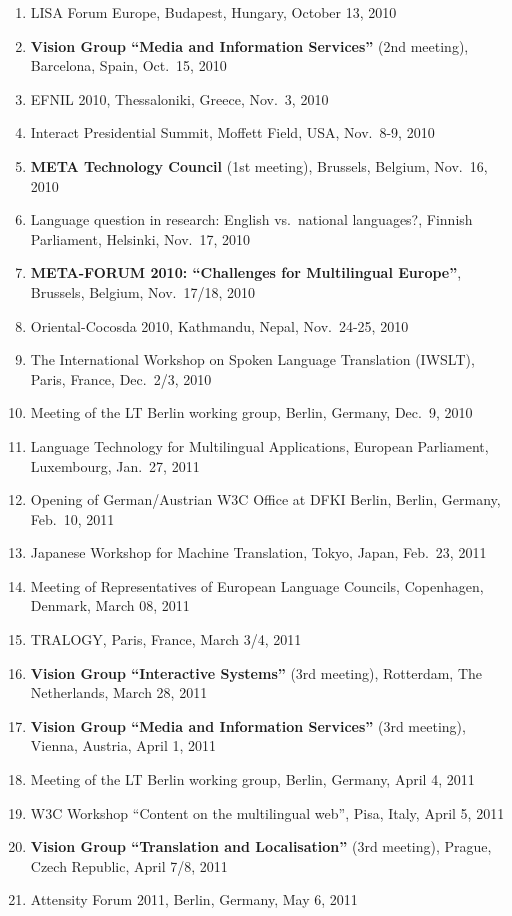 \documentclass[10pt, plain]{../../metanetpaper}
\begin{document}
\begin{small}
\begin{enumerate}
\item LISA Forum Europe, Budapest, Hungary, October 13, 2010
\item \textbf{Vision Group ``Media and Information Services''} (2nd meeting), Barcelona, Spain, Oct.~15, 2010
\item EFNIL 2010, Thessaloniki, Greece, Nov.~3, 2010
\item Interact Presidential Summit, Moffett Field, USA, Nov.~8-9, 2010
\item \textbf{META Technology Council} (1st meeting), Brussels, Belgium, Nov.~16, 2010
\item Language question in research: English vs.~national languages?, Finnish Parliament, Helsinki, Nov.~17, 2010
\item \textbf{META-FORUM 2010: ``Challenges for Multilingual Europe''}, Brussels, Belgium, Nov.~17/18, 2010
\item Oriental-Cocosda 2010, Kathmandu, Nepal, Nov.~24-25, 2010
\item The International Workshop on Spoken Language Translation (IWSLT), Paris, France, Dec.~2/3, 2010
\item Meeting of the LT Berlin working group, Berlin, Germany, Dec.~9, 2010
\item Language Technology for Multilingual Applications, European Parliament, Luxembourg, Jan.~27, 2011
\item Opening of German/Austrian W3C Office at DFKI Berlin, Berlin, Germany, Feb.~10, 2011
\item Japanese Workshop for Machine Translation, Tokyo, Japan, Feb.~23, 2011
\item Meeting of Representatives of European Language Councils, Copenhagen, Denmark, March 08, 2011
\item TRALOGY, Paris, France, March 3/4, 2011
\item \textbf{Vision Group ``Interactive Systems''} (3rd meeting), Rotterdam, The Netherlands, March 28, 2011
\item \textbf{Vision Group ``Media and Information Services''} (3rd meeting), Vienna, Austria, April 1, 2011
\item Meeting of the LT Berlin working group, Berlin, Germany, April 4, 2011
\item W3C Workshop ``Content on the multilingual web'', Pisa, Italy, April 5, 2011
\item \textbf{Vision Group ``Translation and Localisation''} (3rd meeting), Prague, Czech Republic, April 7/8, 2011
\item Attensity Forum 2011, Berlin, Germany, May 6, 2011

\end{enumerate}
\end{small}
\end{document}
